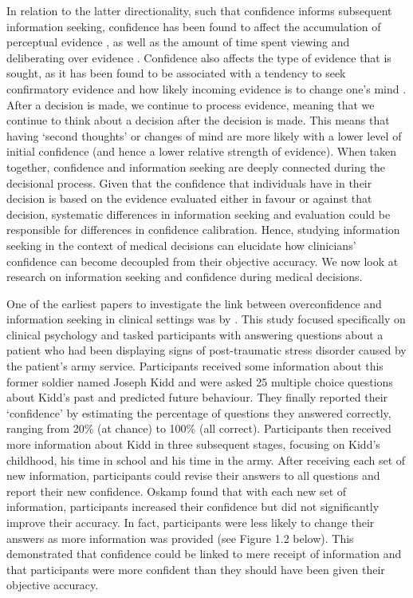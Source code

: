 \documentclass[a4paper, nobind]{templates/ociamthesis}
\begin{document}
\hfill\break
In relation to the latter directionality, such that confidence informs subsequent information seeking, confidence has been found to affect the accumulation of perceptual evidence \textcite{balsdon_confidence_2020}, as well as the amount of time spent viewing \autocite{rausch_cognitive_2020} and deliberating over evidence \autocite{kiani_choice_2014}. Confidence also affects the type of evidence that is sought, as it has been found to be associated with a tendency to seek confirmatory evidence \autocite{rollwage_confidence_2020} and how likely incoming evidence is to change one's mind \autocite{pescetelli_confidence_2021}. After a decision is made, we continue to process evidence, meaning that we continue to think about a decision after the decision is made. This means that having `second thoughts' or changes of mind are more likely with a lower level of initial confidence (and hence a lower relative strength of evidence). When taken together, confidence and information seeking are deeply connected during the decisional process. Given that the confidence that individuals have in their decision is based on the evidence evaluated either in favour or against that decision, systematic differences in information seeking and evaluation could be responsible for differences in confidence calibration. Hence, studying information seeking in the context of medical decisions can elucidate how clinicians' confidence can become decoupled from their objective accuracy. We now look at research on information seeking and confidence during medical decisions.

\hfill\break
One of the earliest papers to investigate the link between overconfidence and information seeking in clinical settings was by \textcite{oskamp_overconfidence_1965}. This study focused specifically on clinical psychology and tasked participants with answering questions about a patient who had been displaying signs of post-traumatic stress disorder caused by the patient's army service. Participants received some information about this former soldier named Joseph Kidd and were asked 25 multiple choice questions about Kidd's past and predicted future behaviour. They finally reported their `confidence' by estimating the percentage of questions they answered correctly, ranging from 20\% (at chance) to 100\% (all correct). Participants then received more information about Kidd in three subsequent stages, focusing on Kidd's childhood, his time in school and his time in the army. After receiving each set of new information, participants could revise their answers to all questions and report their new confidence. Oskamp found that with each new set of information, participants increased their confidence but did not significantly improve their accuracy. In fact, participants were less likely to change their answers as more information was provided (see Figure 1.2 below). This demonstrated that confidence could be linked to mere receipt of information and that participants were more confident than they should have been given their objective accuracy.
\end{document}
